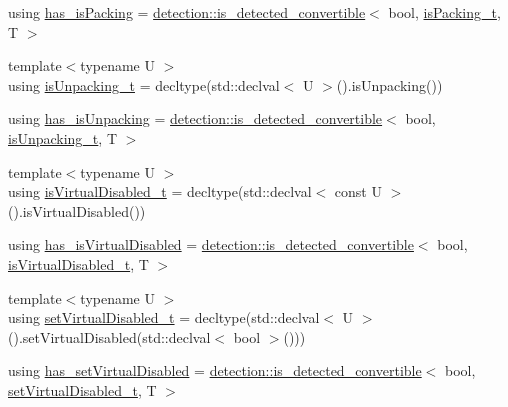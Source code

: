 \begin{DoxyCompactItemize}
\item 
using \hyperlink{structcheckpoint_1_1_serializer_traits_a8b54c38de0887bf25f179e0f065af3fb}{has\+\_\+is\+Packing} = \hyperlink{namespacedetection_afb970b23e39cfecb33449d40242c49ff}{detection\+::is\+\_\+detected\+\_\+convertible}$<$ bool, \hyperlink{structcheckpoint_1_1_serializer_traits_aeec71e5f15a9dc7e8a265d40a65518b0}{is\+Packing\+\_\+t}, T $>$
\item 
{\footnotesize template$<$typename U $>$ }\\using \hyperlink{structcheckpoint_1_1_serializer_traits_abc375c9fd74b102d51a74af8884c72e0}{is\+Unpacking\+\_\+t} = decltype(std\+::declval$<$ U $>$().is\+Unpacking())
\item 
using \hyperlink{structcheckpoint_1_1_serializer_traits_ab3d539e82b415b4a98ac7fc13aaab685}{has\+\_\+is\+Unpacking} = \hyperlink{namespacedetection_afb970b23e39cfecb33449d40242c49ff}{detection\+::is\+\_\+detected\+\_\+convertible}$<$ bool, \hyperlink{structcheckpoint_1_1_serializer_traits_abc375c9fd74b102d51a74af8884c72e0}{is\+Unpacking\+\_\+t}, T $>$
\item 
{\footnotesize template$<$typename U $>$ }\\using \hyperlink{structcheckpoint_1_1_serializer_traits_ad78a62a4399d95f2085684fc09c12196}{is\+Virtual\+Disabled\+\_\+t} = decltype(std\+::declval$<$ const U $>$().is\+Virtual\+Disabled())
\item 
using \hyperlink{structcheckpoint_1_1_serializer_traits_ac590c05fc0b7df1473c2bec826227c78}{has\+\_\+is\+Virtual\+Disabled} = \hyperlink{namespacedetection_afb970b23e39cfecb33449d40242c49ff}{detection\+::is\+\_\+detected\+\_\+convertible}$<$ bool, \hyperlink{structcheckpoint_1_1_serializer_traits_ad78a62a4399d95f2085684fc09c12196}{is\+Virtual\+Disabled\+\_\+t}, T $>$
\item 
{\footnotesize template$<$typename U $>$ }\\using \hyperlink{structcheckpoint_1_1_serializer_traits_ac8e1715e588932dc8e4dc14130b6ca9e}{set\+Virtual\+Disabled\+\_\+t} = decltype(std\+::declval$<$ U $>$().set\+Virtual\+Disabled(std\+::declval$<$ bool $>$()))
\item 
using \hyperlink{structcheckpoint_1_1_serializer_traits_adba95a75d3573b6d8d11bf9d2300a9ca}{has\+\_\+set\+Virtual\+Disabled} = \hyperlink{namespacedetection_afb970b23e39cfecb33449d40242c49ff}{detection\+::is\+\_\+detected\+\_\+convertible}$<$ bool, \hyperlink{structcheckpoint_1_1_serializer_traits_ac8e1715e588932dc8e4dc14130b6ca9e}{set\+Virtual\+Disabled\+\_\+t}, T $>$
\end{DoxyCompactItemize}
